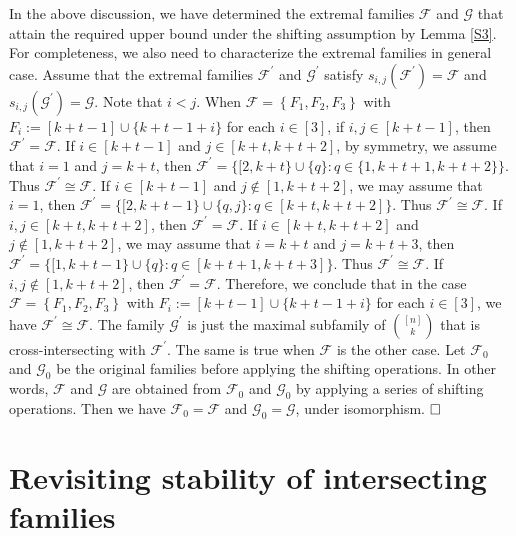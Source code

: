 \documentclass[11pt]{article}
\numberwithin{equation}{section}
\begin{document}
In the above discussion, we have determined the extremal families 
$\mathcal{F}$ and $\mathcal{G}$ that attain the required upper bound  under the shifting assumption by Lemma \ref{S3}. 
For completeness, we also need to characterize the extremal families in general case. 
Assume that  the extremal families $\mathcal{F}^{\prime}$ and $\mathcal{G}^{\prime}$ satisfy $s_{i, j}\left(\mathcal{F}^{\prime}\right)=\mathcal{F}$ and $s_{i,j}\left(\mathcal{G}^{\prime}\right)=\mathcal{G}$.
Note that $i<j$.
When $\mathcal{F}=\left\{F_1,F_2,F_3 \right\}$ with 
$F_i:=[k+t-1]\cup \{k+t-1+i\}$ for each $i\in [3]$, if $i,j\in [k+t-1]$, then $\mathcal{F}^{\prime}=\mathcal{F}$.
If $i\in [k+t-1]$ and $j\in [k+t, k+t+2]$, by symmetry, we assume that $i=1$ and $j=k+t$, then $\mathcal{F}^{\prime}=\{[2,k+t\}\cup\{q\}: q\in\{1,k+t+1, k+t+2\}\}$. Thus $\mathcal{F}^{\prime} \cong\mathcal{F}$. If $i\in [k+t-1]$ and $j\notin [1, k+t+2]$, we may assume that $i=1$, then 
$\mathcal{F}^{\prime}=\{[2,k+t-1\}\cup\{q,j\}: q\in[k+t, k+t+2]\}$. Thus  $\mathcal{F}^{\prime}\cong\mathcal{F}$. 
If $i,j\in[k+t, k+t+2]$, then $\mathcal{F}^{\prime}=\mathcal{F}$.
If $i\in[k+t, k+t+2]$ and $j\notin [1, k+t+2]$, we may assume that $i=k+t$ and $j=k+t+3$, then $\mathcal{F}^{\prime}=\{[1,k+t-1\}\cup\{q\}: q\in[k+t+1, k+t+3]\}$.  Thus  $\mathcal{F}^{\prime}\cong\mathcal{F}$.
If $i,j\notin [1, k+t+2]$, then $\mathcal{F}^{\prime} =\mathcal{F}$. 
Therefore, we conclude that in the case $\mathcal{F}=\left\{F_1,F_2,F_3 \right\}$ with 
$F_i:=[k+t-1]\cup \{k+t-1+i\}$ for each $i\in [3]$, we have $\mathcal{F}^{\prime} \cong\mathcal{F}$. The family $\mathcal{G}^{\prime}$ is just the maximal subfamily of $\binom{[n]}{k}$ that is cross-intersecting with $\mathcal{F}^{\prime}$.
The same is true when $\mathcal{F}$ is the other case.
Let $\mathcal{F}_0$ and $\mathcal{G}_0$ be the original families before applying the shifting operations. 
In other words, $\mathcal{F}$ and $ \mathcal{G}$ are obtained from $\mathcal{F}_0 $ and $ \mathcal{G}_0$ by applying a series of shifting operations.
Then we have $\mathcal{F}_0=\mathcal{F}$ and $\mathcal{G}_0=\mathcal{G}$, under isomorphism. 
$\hfill \square$












\section{Revisiting stability of intersecting families}
\end{document}
